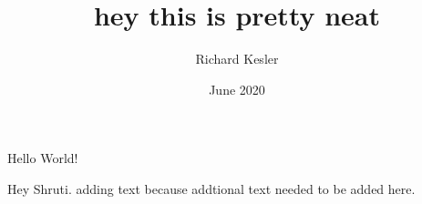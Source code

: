 \documentclass{article}
\title{hey this is pretty neat}
\author{Richard Kesler}
\date{June 2020}
\begin{document}
	\maketitle
	Hello World!

	Hey Shruti. adding text because addtional text needed to be added here.
\end{document}
